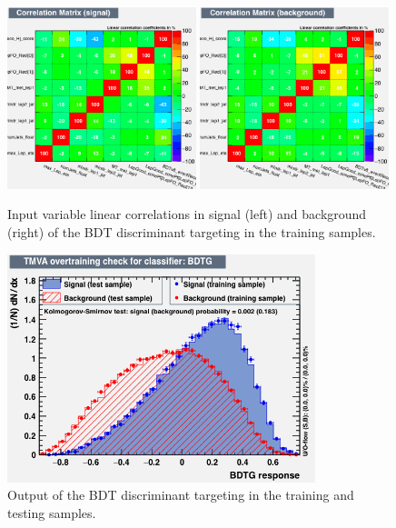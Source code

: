 \begin{figure}[hbtp]
 \begin{center}
   \includegraphics[width=0.49\textwidth]{ch8_figs/train_2lss_ttv_hj_value/CorrelationMatrixS.png}
   \includegraphics[width=0.49\textwidth]{ch8_figs/train_2lss_ttv_hj_value/CorrelationMatrixB.png}
   \caption[Input variable linear correlations of the BDT discriminant targeting \ttv]{Input variable linear correlations in signal (left) and background (right)
     of the BDT discriminant targeting \ttv in the training samples.}
   \label{fig:ttvBdt_corrMatrix}
 \end{center}
\end{figure}

\begin{figure}[hbtp]
 \begin{center}
   \includegraphics[width=0.8\textwidth]{ch8_figs/train_2lss_ttv_hj_value/overtrain_BDTG.png}
   \caption[Output of the BDT discriminant targeting \ttv]{Output of the BDT discriminant targeting \ttv in the training and testing samples.}
   \label{fig:ttvBdt_score}
 \end{center}
\end{figure}
